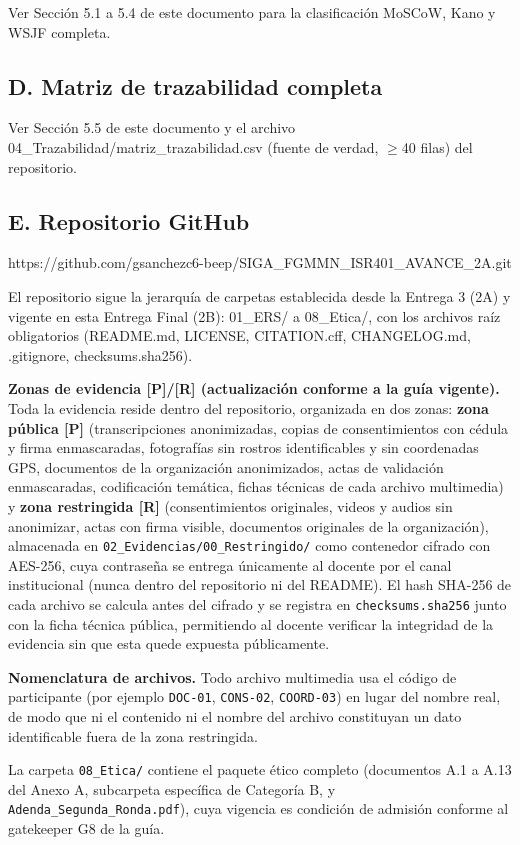 Ver Sección 5.1 a 5.4 de este documento para la clasificación MoSCoW, Kano y WSJF completa.


\subsection*{D. Matriz de trazabilidad completa}


Ver Sección 5.5 de este documento y el archivo 04\_Trazabilidad/matriz\_trazabilidad.csv (fuente de verdad, $\geq$40 filas) del repositorio.


\subsection*{E. Repositorio GitHub}


https://github.com/gsanchezc6-beep/SIGA\_FGMMN\_ISR401\_AVANCE\_2A.git


El repositorio sigue la jerarquía de carpetas establecida desde la Entrega 3 (2A) y vigente en esta Entrega Final (2B): 01\_ERS/ a 08\_Etica/, con los archivos raíz obligatorios (README.md, LICENSE, CITATION.cff, CHANGELOG.md, .gitignore, checksums.sha256).

\textbf{Zonas de evidencia [P]/[R] (actualización conforme a la guía vigente).} Toda la evidencia reside dentro del repositorio, organizada en dos zonas: \textbf{zona pública [P]} (transcripciones anonimizadas, copias de consentimientos con cédula y firma enmascaradas, fotografías sin rostros identificables y sin coordenadas GPS, documentos de la organización anonimizados, actas de validación enmascaradas, codificación temática, fichas técnicas de cada archivo multimedia) y \textbf{zona restringida [R]} (consentimientos originales, videos y audios sin anonimizar, actas con firma visible, documentos originales de la organización), almacenada en \nolinkurl{02_Evidencias/00_Restringido/} como contenedor cifrado con AES-256, cuya contraseña se entrega únicamente al docente por el canal institucional (nunca dentro del repositorio ni del README). El hash SHA-256 de cada archivo se calcula antes del cifrado y se registra en \texttt{checksums.sha256} junto con la ficha técnica pública, permitiendo al docente verificar la integridad de la evidencia sin que esta quede expuesta públicamente.

\textbf{Nomenclatura de archivos.} Todo archivo multimedia usa el código de participante (por ejemplo \texttt{DOC-01}, \texttt{CONS-02}, \texttt{COORD-03}) en lugar del nombre real, de modo que ni el contenido ni el nombre del archivo constituyan un dato identificable fuera de la zona restringida.

La carpeta \nolinkurl{08_Etica/} contiene el paquete ético completo (documentos A.1 a A.13 del Anexo A, subcarpeta específica de Categoría B, y \texttt{Adenda\_Segunda\_Ronda.pdf}), cuya vigencia es condición de admisión conforme al gatekeeper G8 de la guía.
